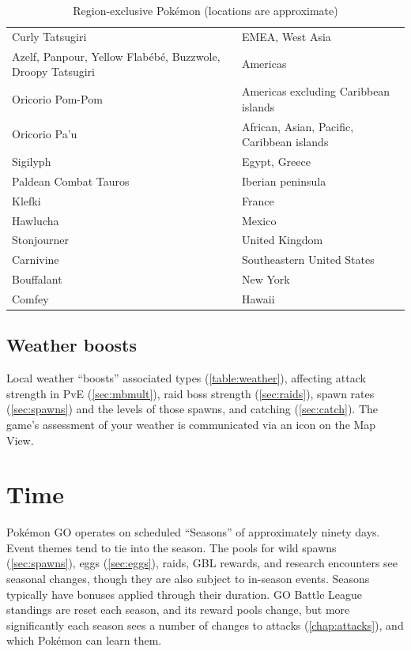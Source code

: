 \begin{table}
\begin{tabular}{p{}l}
Curly Tatsugiri & EMEA, West Asia\\
\rowcolor{Gray!25}
Azelf, Panpour, Yellow Flabébé, Buzzwole, Droopy Tatsugiri & Americas\\
Oricorio Pom-Pom & Americas excluding Caribbean islands\\
\rowcolor{Gray!25}
Oricorio Pa'u & African, Asian, Pacific, Caribbean islands\\
Sigilyph & Egypt, Greece\\
\rowcolor{Gray!25}
Paldean Combat Tauros & Iberian peninsula\\
Klefki & France\\
\rowcolor{Gray!25}
Hawlucha & Mexico\\
Stonjourner & United Kingdom\\
\rowcolor{Gray!25}
Carnivine & Southeastern United States\\
Bouffalant & New York\\
\rowcolor{Gray!25}
Comfey & Hawaii\\
\end{tabular}
\caption{Region-exclusive Pokémon (locations are approximate)\label{table:regional}}
\end{table}
\subsection{Weather boosts\label{sec:weather}}
Local weather ``boosts'' associated types (\autoref{table:weather}),
  affecting attack strength in PvE (\autoref{sec:mbmult}),
  raid boss strength (\autoref{sec:raids}),
  spawn rates (\autoref{sec:spawns}) and the levels of those spawns,
  and catching (\autoref{sec:catch}).
The game's assessment of your weather is communicated via an icon on the Map View.
\begin{table}

\end{table}
\section{Time\label{sec:timeline}}
Pokémon GO operates on scheduled ``Seasons'' of approximately ninety days.
Event themes tend to tie into the season.
The pools for wild spawns (\autoref{sec:spawns}), eggs (\autoref{sec:eggs}), raids, GBL rewards,
 and research encounters see seasonal changes, though they are also subject to in-season events.
Seasons typically have bonuses applied through their duration.
GO Battle League standings are reset each season, and its reward pools change, but
 more significantly each season sees a number of changes to attacks (\autoref{chap:attacks}),
 and which Pokémon can learn them.

